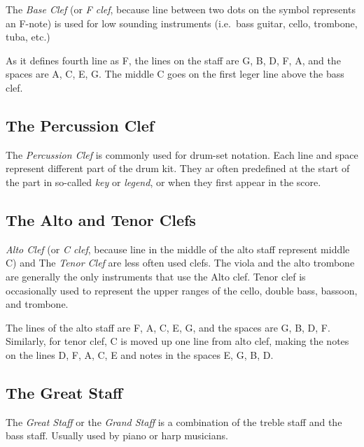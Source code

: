 The \textit{Base Clef} (or \textit{F clef}, because line between two dots on the symbol represents an F-note) is used for
low sounding instruments (i.e.\ bass guitar, cello, trombone, tuba, etc.)

\figcenter{}

As it defines fourth line as F, the lines on the staff are G, B, D, F, A, and the spaces are A, C, E, G\@. The middle C
goes on the first leger line above the bass clef.


\subsection{The Percussion Clef}\label{subsec:the-percussion-clef}

The \textit{Percussion Clef} is commonly used for drum-set notation. Each line and space represent different part of
the drum kit. They ar often predefined at the start of the part in so-called \textit{key} or \textit{legend}, or when
they first appear in the score.

\figcenter{}


\subsection{The Alto and Tenor Clefs}\label{subsec:the-alto-and-tenor-clefs}

\textit{Alto Clef} (or \textit{C clef}, because line in the middle of the alto staff represent middle C) and
The \textit{Tenor Clef} are less often used clefs. The viola and the alto trombone are generally the only instruments that
use the Alto clef. Tenor clef is occasionally used to represent the upper ranges of the cello, double bass, bassoon,
and trombone.

\figcenter{}

The lines of the alto staff are F, A, C, E, G, and the spaces are G, B, D, F\@. Similarly, for tenor clef, C is moved up
one line from alto clef, making the notes on the lines D, F, A, C, E and notes in the spaces E, G, B, D\@.

\subsection{The Great Staff}\label{subsec:the-great-staff}
The \textit{Great Staff} or the \textit{Grand Staff} is a combination of the treble staff and the bass staff. Usually
used by piano or harp musicians.

